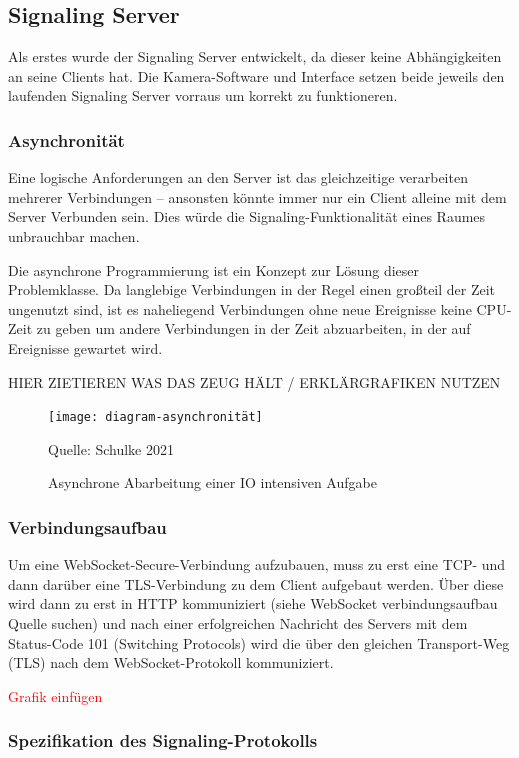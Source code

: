 \documentclass{article}
\newcommand{\figuresource}[1]{
	\begin{center}Quelle: #1\end{center}
}
\begin{document}
\begin{onecolumn}
\subsection{Signaling Server}

Als erstes wurde der Signaling Server entwickelt, da dieser keine
Abhängigkeiten an seine Clients hat. Die Kamera-Software und Interface setzen
beide jeweils den laufenden Signaling Server vorraus um korrekt zu
funktioneren.

\subsubsection*{Asynchronität}

Eine logische Anforderungen an den Server ist das gleichzeitige verarbeiten
mehrerer Verbindungen – ansonsten könnte immer nur ein Client alleine mit dem
Server Verbunden sein. Dies würde die Signaling-Funktionalität eines Raumes
unbrauchbar machen.

Die asynchrone Programmierung ist ein Konzept zur Lösung dieser Problemklasse.
Da langlebige Verbindungen in der Regel einen großteil der Zeit ungenutzt sind,
ist es naheliegend Verbindungen ohne neue Ereignisse keine CPU-Zeit zu geben
um andere Verbindungen in der Zeit abzuarbeiten, in der auf Ereignisse gewartet
wird.

HIER ZIETIEREN WAS DAS ZEUG HÄLT / ERKLÄRGRAFIKEN NUTZEN

\begin{figure}[ht]
	\texttt{[image: diagram-asynchronität]}
	\centering
	\caption{Asynchrone Abarbeitung einer IO intensiven Aufgabe}
	\figuresource{Schulke 2021}
\end{figure}

\subsubsection{Verbindungsaufbau}

Um eine WebSocket-Secure-Verbindung aufzubauen, muss zu erst eine TCP- und dann
darüber eine TLS-Verbindung zu dem Client aufgebaut werden. Über diese wird
dann zu erst in HTTP kommuniziert (siehe WebSocket verbindungsaufbau Quelle
suchen) und nach einer erfolgreichen Nachricht des Servers mit dem Status-Code
101 (Switching Protocols) wird die über den gleichen Transport-Weg (TLS)
nach dem WebSocket-Protokoll kommuniziert.

\textcolor{red}{Grafik einfügen}

\subsubsection{Spezifikation des Signaling-Protokolls}


\end{onecolumn}
\end{document}
